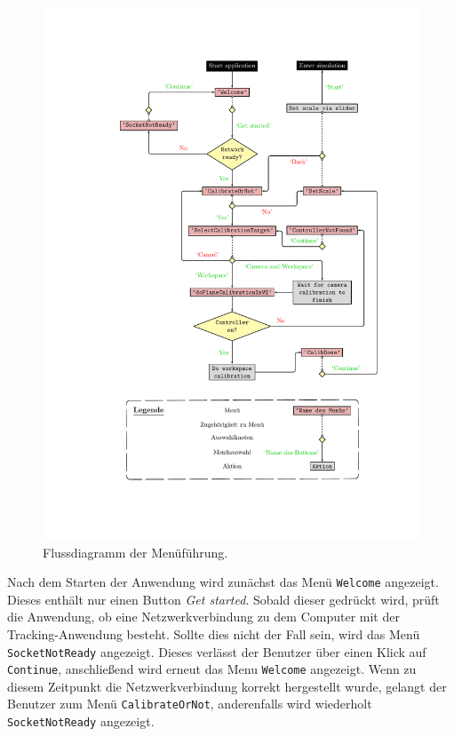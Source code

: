 \begin{figure}[htbp]
	\centering
	\includegraphics[scale=.9, trim=5.5cm 2.5cm 3.5cm 2.5cm]{kapitel/system/MP_Menu_Flowchart.pdf}
	\caption{Flussdiagramm der Menüführung.}
	\label{fig:menuFlow}
\end{figure}

Nach dem Starten der Anwendung wird zunächst das Menü \texttt{Welcome} angezeigt. Dieses enthält nur einen Button \textit{Get started}. Sobald dieser gedrückt wird, prüft die Anwendung, ob eine Netzwerkverbindung zu dem Computer mit der Tracking-Anwendung besteht. Sollte dies nicht der Fall sein, wird das Menü \texttt{Socket\-Not\-Ready} angezeigt. Dieses verlässt der Benutzer über einen Klick auf \texttt{Continue}, anschließend wird erneut das Menu \texttt{Welcome} angezeigt. Wenn zu diesem Zeitpunkt die Netzwerkverbindung korrekt hergestellt wurde, gelangt der Benutzer zum Menü \texttt{Calibrate\-Or\-Not}, anderenfalls wird wiederholt \texttt{Socket\-Not\-Ready} angezeigt.

